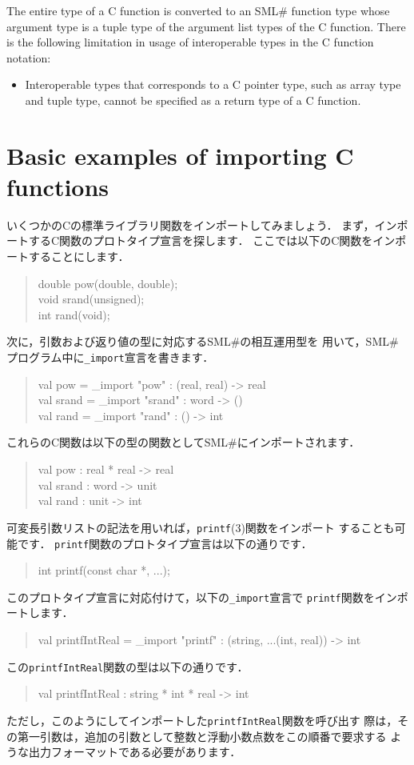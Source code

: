 \documentclass{jbook}
\newcommand{\txt}[2]{#2}
\newcommand{\smlsharp}{SML\#}
\newenvironment{program}{\begin{quote}\begin{tt}}%
                        {\end{tt}\end{quote}}
\begin{document}
	The entire type of a C function is converted to an \smlsharp{}
function type whose argument type is a tuple type of the argument list types
of the C function.
	There is the following limitation in usage of interoperable types
in the C function notation:
\begin{itemize}
\item
	Interoperable types that corresponds to a C pointer type, such as
array type and tuple type, cannot be specified as a return type of
a C function.
\end{itemize}

\fi%

\section{\txt{基本的なC関数のインポート例}
             {Basic examples of importing C functions}}

\ifjp%

	いくつかのCの標準ライブラリ関数をインポートしてみましょう．
	まず，インポートするC関数のプロトタイプ宣言を探します．
	ここでは以下のC関数をインポートすることにします．
\begin{program}
double pow(double, double);\\
void srand(unsigned);\\
int rand(void);
\end{program}
	次に，引数および返り値の型に対応する\smlsharp{}の相互運用型を
用いて，\smlsharp{}プログラム中に{\tt \_import}宣言を書きます．
\begin{program}
val pow = \_import "pow" : (real, real) -> real\\
val srand = \_import "srand" : word -> ()\\
val rand = \_import "rand" : () -> int
\end{program}
	これらのC関数は以下の型の関数として\smlsharp{}にインポートされます．
\begin{program}
val pow : real * real -> real\\
val srand : word -> unit\\
val rand : unit -> int
\end{program}

	可変長引数リストの記法を用いれば，{\tt printf}(3)関数をインポート
することも可能です．
	{\tt printf}関数のプロトタイプ宣言は以下の通りです．
\begin{program}
int printf(const char *, ...);
\end{program}
	このプロトタイプ宣言に対応付けて，以下の{\tt \_import}宣言で
{\tt printf}関数をインポートします．
\begin{program}
val printfIntReal = \_import "printf" : (string, ...(int, real)) -> int
\end{program}
	この{\tt printfIntReal}関数の型は以下の通りです．
\begin{program}
val printfIntReal : string * int * real -> int
\end{program}
	ただし，このようにしてインポートした{\tt printfIntReal}関数を呼び出す
際は，その第一引数は，追加の引数として整数と浮動小数点数をこの順番で要求する
ような出力フォーマットである必要があります．
\end{document}
